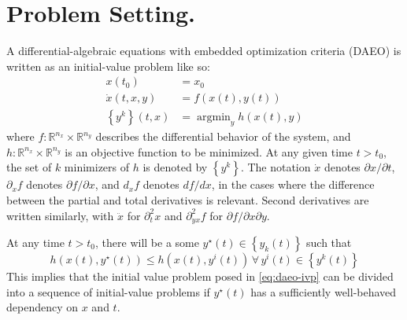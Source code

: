 \documentclass[twoside,leqno,twocolumn]{article}
\DeclareMathOperator*{\argmin}{\arg\min}
\newcommand{\bbR}{\ensuremath{\mathbb{R}}}
\begin{document}
\section{Problem Setting.}
A differential-algebraic equations with embedded optimization criteria (DAEO) is written as an initial-value problem like so:
\begin{equation} \label{eq:daeo-ivp}
\begin{aligned}
	x(t_0) &= x_0\\
	\dot{x}(t, x, y) &= f(x(t), y(t))\\
	\left\{y^k\right\}(t, x) &= \argmin_{y}h(x(t), y)
\end{aligned}
\end{equation}
where $f:\bbR^{n_x}\times\bbR^{n_y}$ describes the differential behavior of the system, and $h:\bbR^{n_x}\times\bbR^{n_y}$ is an objective function to be minimized. At any given time $t>t_0$, the set of $k$ minimizers of $h$ is denoted by $\left\{y^k\right\}$. The notation $\dot{x}$ denotes $\partial x/\partial t$, $\partial_x f$ denotes $\partial f/\partial x$, and $d_x f$ denotes $df/dx$, in the cases where the difference between the partial and total derivatives is relevant. Second derivatives are written similarly, with $\ddot{x}$ for $\partial^2_t x$ and $\partial^2_{yx} f$ for $\partial f/\partial x\partial y$.

At any time $t > t_0$, there will be a some $y^\star(t)\in\left\{y_k(t)\right\}$ such that
\begin{equation}
	h(x(t), y^\star(t))\leq h(x(t),y^i(t))\, \forall\,y^i(t)\in\left\{y^k(t)\right\} 
\end{equation}
This implies that the initial value problem posed in \eqref{eq:daeo-ivp} can be divided into a sequence of initial-value problems if $y^\star(t)$ has a sufficiently well-behaved dependency on $x$ and $t$.
\end{document}
